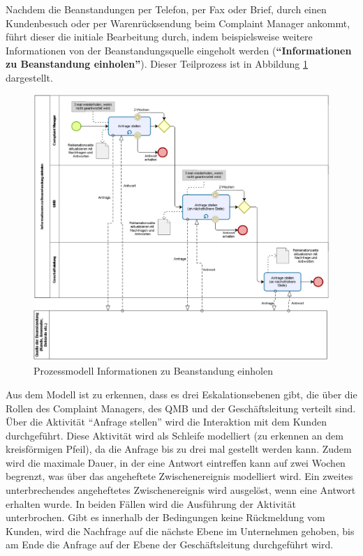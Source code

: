 \documentclass[a4paper,12pt]{report}
\begin{document}
Nachdem die Beanstandungen per Telefon, per Fax oder Brief, durch einen Kundenbesuch oder per Warenrücksendung beim Complaint Manager ankommt, führt dieser die initiale Bearbeitung durch, indem beispielsweise weitere Informationen von der Beanstandungsquelle eingeholt werden (\textbf{"`Informationen zu Beanstandung einholen"'}). Dieser Teilprozess ist in Abbildung \ref{modell_informationen_einholen} dargestellt.
\begin{figure}[ht]
\centering
\includegraphics[width=1.0\textwidth]{Images/information_gathering}
\caption[Prozessmodell Informationen zu Beanstandung einholen]{Prozessmodell Informationen zu Beanstandung einholen}
\label{modell_informationen_einholen}
\end{figure}
Aus dem Modell ist zu erkennen, dass es drei Eskalationsebenen gibt, die über die Rollen des Complaint Managers, des QMB und der Geschäftsleitung verteilt sind. Über die Aktivität "`Anfrage stellen"' wird die Interaktion mit dem Kunden durchgeführt. Diese Aktivität wird als Schleife modelliert (zu erkennen an dem kreisförmigen Pfeil), da die Anfrage bis zu drei mal gestellt werden kann. Zudem wird die maximale Dauer, in der eine Antwort eintreffen kann auf zwei Wochen begrenzt, was über das angeheftete Zwischenereignis modelliert wird. Ein zweites unterbrechendes angeheftetes Zwischenereignis wird ausgelöst, wenn eine Antwort erhalten wurde. In beiden Fällen wird die Ausführung der Aktivität unterbrochen. Gibt es innerhalb der Bedingungen keine Rückmeldung vom Kunden, wird die Nachfrage auf die nächste Ebene im Unternehmen gehoben, bis am Ende die Anfrage auf der Ebene der Geschäftsleitung durchgeführt wird.
\end{document}
